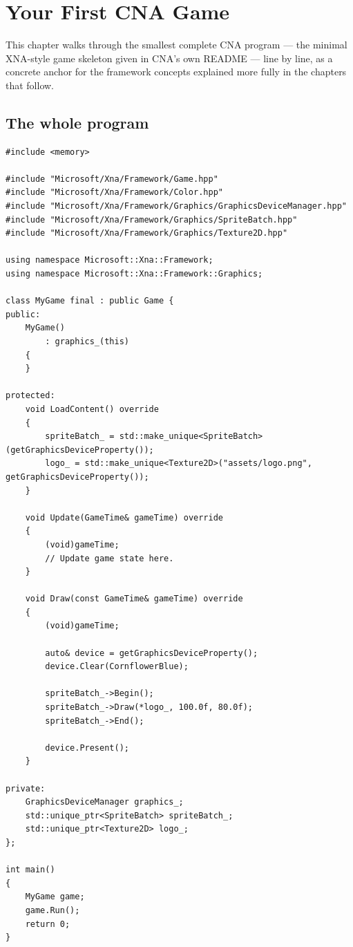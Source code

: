 \chapter{Your First CNA Game}
\label{ch:first-game}

This chapter walks through the smallest complete CNA program --- the minimal XNA-style game
skeleton given in CNA's own README --- line by line, as a concrete anchor for the framework
concepts explained more fully in the chapters that follow.

\section{The whole program}

\begin{lstlisting}
#include <memory>

#include "Microsoft/Xna/Framework/Game.hpp"
#include "Microsoft/Xna/Framework/Color.hpp"
#include "Microsoft/Xna/Framework/Graphics/GraphicsDeviceManager.hpp"
#include "Microsoft/Xna/Framework/Graphics/SpriteBatch.hpp"
#include "Microsoft/Xna/Framework/Graphics/Texture2D.hpp"

using namespace Microsoft::Xna::Framework;
using namespace Microsoft::Xna::Framework::Graphics;

class MyGame final : public Game {
public:
    MyGame()
        : graphics_(this)
    {
    }

protected:
    void LoadContent() override
    {
        spriteBatch_ = std::make_unique<SpriteBatch>(getGraphicsDeviceProperty());
        logo_ = std::make_unique<Texture2D>("assets/logo.png", getGraphicsDeviceProperty());
    }

    void Update(GameTime& gameTime) override
    {
        (void)gameTime;
        // Update game state here.
    }

    void Draw(const GameTime& gameTime) override
    {
        (void)gameTime;

        auto& device = getGraphicsDeviceProperty();
        device.Clear(CornflowerBlue);

        spriteBatch_->Begin();
        spriteBatch_->Draw(*logo_, 100.0f, 80.0f);
        spriteBatch_->End();

        device.Present();
    }

private:
    GraphicsDeviceManager graphics_;
    std::unique_ptr<SpriteBatch> spriteBatch_;
    std::unique_ptr<Texture2D> logo_;
};

int main()
{
    MyGame game;
    game.Run();
    return 0;
}
\end{lstlisting}

